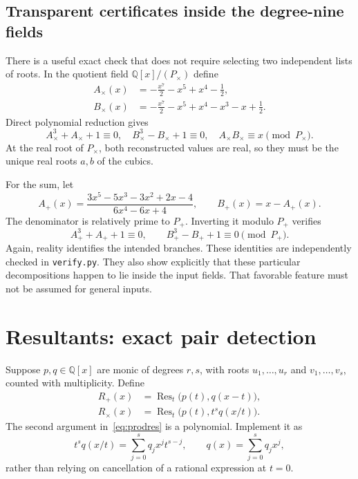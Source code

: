 \documentclass[11pt,letterpaper]{article}
\theoremstyle{definition}\newtheorem{definition}[theorem]{Definition}
\theoremstyle{remark}\newtheorem{remark}[theorem]{Remark}
\newcommand{\Q}{\mathbb Q}
\newcommand{\Res}{\operatorname{Res}}
\newcommand{\WL}[1]{\texttt{#1}}
\begin{document}
\subsection{Transparent certificates inside the degree-nine fields}
There is a useful exact check that does not require selecting two independent lists of roots. In the quotient field $\Q[x]/(P_\times)$ define
\begin{align}
 A_\times(x)&=-\frac{x^7}{2}-x^5+x^4-\frac12,\label{eq:ar}\\
 B_\times(x)&=-\frac{x^7}{2}-x^5+x^4-x^3-x+\frac12.
\end{align}
Direct polynomial reduction gives
\begin{equation}
 A_\times^3+A_\times+1\equiv0,\quad
 B_\times^3-B_\times+1\equiv0,\quad
 A_\times B_\times\equiv x\pmod{P_\times}.
 \label{eq:productcert}
\end{equation}
At the real root of $P_\times$, both reconstructed values are real, so they must be the unique real roots $a,b$ of the cubics.

For the sum, let
\begin{equation}
 A_+(x)=\frac{3x^5-5x^3-3x^2+2x-4}{6x^4-6x+4},
 \qquad B_+(x)=x-A_+(x).
 \label{eq:asum}
\end{equation}
The denominator is relatively prime to $P_+$. Inverting it modulo $P_+$ verifies
\[
 A_+^3+A_++1\equiv0,\qquad B_+^3-B_++1\equiv0\pmod{P_+}.
\]
Again, reality identifies the intended branches. These identities are independently checked in \WL{verify.py}. They also show explicitly that these particular decompositions happen to lie inside the input fields. That favorable feature must not be assumed for general inputs.

\section{Resultants: exact pair detection}
\label{sec:resultants}
Suppose $p,q\in\Q[x]$ are monic of degrees $r,s$, with roots $u_1,\ldots,u_r$ and $v_1,\ldots,v_s$, counted with multiplicity. Define
\begin{align}
 R_+(x)&=\Res_t\bigl(p(t),q(x-t)\bigr),\label{eq:sumres}\\
 R_\times(x)&=\Res_t\bigl(p(t),t^s q(x/t)\bigr).
 \label{eq:prodres}
\end{align}
The second argument in~\eqref{eq:prodres} is a polynomial. Implement it as
\begin{equation}
 t^s q(x/t)=\sum_{j=0}^{s}q_jx^jt^{s-j},\qquad q(x)=\sum_{j=0}^{s}q_jx^j,
 \label{eq:homogenize}
\end{equation}
rather than relying on cancellation of a rational expression at $t=0$.
\end{document}
